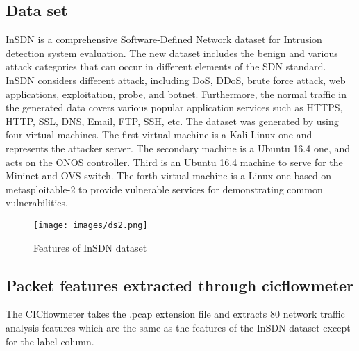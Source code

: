 \subsection{Data set}
\vspace{-18pt}
InSDN is a comprehensive Software-Defined Network dataset for Intrusion detection system evaluation. The new dataset includes the benign and various attack categories  that can occur in different elements of the SDN standard. InSDN considers different attack, including DoS, DDoS, brute force attack, web applications, exploitation, probe, and botnet. Furthermore, the normal traffic in the generated data covers  various  popular  application services such as HTTPS, HTTP, SSL, DNS, Email, FTP, SSH, etc. The dataset was generated by using four virtual machines. The first virtual machine is a Kali Linux one and represents the attacker server. The secondary machine is a Ubuntu 16.4 one, and acts on the ONOS controller. Third is an Ubuntu 16.4 machine to serve for the Mininet and OVS switch. The forth virtual machine is a Linux one based on metasploitable-2 to provide vulnerable services for demonstrating common vulnerabilities\cite{article}.
\begin{figure}[h] %
\begin{center}
	\texttt{[image: images/ds2.png]} 
	\caption{Features of InSDN dataset} %
	\label{} %
\end{center}
\end{figure}
\subsection{Packet features extracted through cicflowmeter}
\vspace{-18pt}
The CICflowmeter takes the .pcap extension file and extracts 80 network traffic analysis features which are the same as the features of the InSDN dataset except for the label column.
